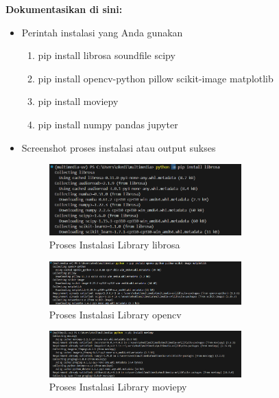 \documentclass[11pt,a4paper]{article}
\begin{document}
\textbf{Dokumentasikan di sini:}
\begin{itemize}
    \item Perintah instalasi yang Anda gunakan
    \begin{enumerate}
        \item pip install librosa soundfile scipy
        \item pip install opencv-python pillow scikit-image matplotlib
        \item pip install moviepy
        \item pip install numpy pandas jupyter
    \end{enumerate}
    \item Screenshot proses instalasi atau output sukses
    \begin{figure}[htbp] 
    \centering
    \includegraphics[width=0.7\textwidth]{Figure/ss3.png}
    \caption{Proses Instalasi Library librosa}
    \label{fig:contoh-gambar}
    \end{figure}

    \begin{figure}[htbp]
    \centering
    \includegraphics[width=0.7\textwidth]{Figure/ss4.png}
    \caption{Proses Instalasi Library opencv}
    \label{fig:contoh-gambar}
    \end{figure}

    \begin{figure}[htbp]
    \centering
    \includegraphics[width=0.7\textwidth]{Figure/ss5.png}
    \caption{Proses Instalasi Library moviepy}
    \label{fig:contoh-gambar}
    \end{figure}


\end{itemize}
\end{document}
